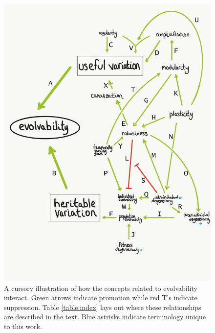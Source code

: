 \begin{figure}[!htbp]
  \includegraphics[width=\textwidth]{img/mindmap}
  \captionsetup{singlelinecheck=off,justification=raggedright}
  \caption{A cursory illustration of how the concepts related to evolvability interact. Green arrows indicate promotion while red T's indicate suppression. Table \ref{table:index} lays out where these relationships are described in the text. Blue astrisks indicate terminology unique to this work.}
     \label{fig:mindmap}
\end{figure}